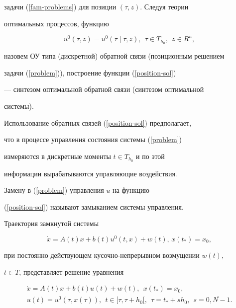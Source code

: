задачи (\ref{fam-problems}) для позиции $(\tau,z)$. Следуя теории


оптимальных процессов, функцию


\begin{equation}\label{position-sol}


u^0(\tau,z)=u^0(\tau\mid\tau,z),\ \ \tau\in T_{h_0},\ \ z\in R^n,


\end{equation}


назовем ОУ типа (дискретной) обратной связи (позиционным решением


задачи (\ref{problem})), построение функции (\ref{position-sol})


--- синтезом оптимальной обратной связи (синтезом оптимальной


системы).





Использование обратных связей (\ref{position-sol}) предполагает,


что в процессе управления состояния системы (\ref{problem})


измеряются в дискретные моменты $t\in T_{h_0}$ и по этой


информации вырабатываются управляющие воздействия.





Замену в (\ref{problem}) управления $u$ на функцию


(\ref{position-sol}) называют замыканием системы управления.


Траектория замкнутой системы


\begin{equation}\label{close-sistem}


\Dot{x}=A(t)x+b(t)u^0(t,x)+w(t),\,x(t_*)=x_0,


\end{equation}


при постоянно действующем кусочно-непрерывном возмущении $w(t)$,


$t\in T$, представляет решение уравнения


\begin{gather*}


\Dot{x}=A(t)x+b(t)u(t)+w(t),\ \ x(t_*)=x_0,\\


u(t)=u^0(\tau,x(\tau)),\ \ t\in


[\tau,\tau+h_0[,\ \ \tau=t_*+sh_0,\ \ s=\overline{0,N-1}.


\end{gather*}





